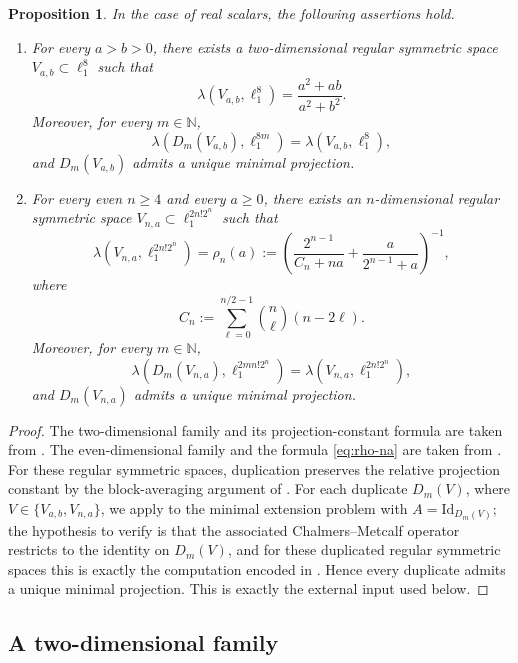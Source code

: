 \documentclass[11pt]{amsart}
\numberwithin{equation}{section}
\newtheorem{proposition}[theorem]{Proposition}
\theoremstyle{definition}
\theoremstyle{remark}
\newcommand{\N}{\mathbb N}
\newcommand{\Id}{\mathrm{Id}}
\begin{document}
\begin{proposition}
\label{prop:regular-input}
In the case of real scalars, the following assertions hold.
\begin{enumerate}[label=\textup{(\roman*)}]
\item For every $a>b>0$, there exists a two-dimensional regular symmetric space $V_{a,b}\subset \ell_1^8$ such that
\[
\lambda(V_{a,b},\ell_1^8)=\frac{a^2+ab}{a^2+b^2}.
\]
Moreover, for every $m\in\N$,
\[
\lambda(D_m(V_{a,b}),\ell_1^{8m})=\lambda(V_{a,b},\ell_1^8),
\]
and $D_m(V_{a,b})$ admits a unique minimal projection.
\item For every even $n\geqslant 4$ and every $a\geqslant 0$, there exists an $n$-dimensional regular symmetric space $V_{n,a}\subset \ell_1^{2n!2^n}$ such that
\begin{equation}
\label{eq:rho-na}
\lambda(V_{n,a},\ell_1^{2n!2^n})
= \rho_n(a)
:=
\left(
\frac{2^{n-1}}{C_n+na}
+
\frac{a}{2^{n-1}+a}
\right)^{-1},
\end{equation}
where
\[
C_n:=\sum_{\ell=0}^{n/2-1} \binom n\ell (n-2\ell).
\]
Moreover, for every $m\in\N$,
\[
\lambda(D_m(V_{n,a}),\ell_1^{2mn!2^n})=\lambda(V_{n,a},\ell_1^{2n!2^n}),
\]
and $D_m(V_{n,a})$ admits a unique minimal projection.
\end{enumerate}
\end{proposition}

\begin{proof}
The two-dimensional family and its projection-constant formula are taken from \cite{CL4}. The even-dimensional family and the formula \eqref{eq:rho-na} are taken from \cite{CL3}. For these regular symmetric spaces, duplication preserves the relative projection constant by the block-averaging argument of \cite[Lemma~2.3]{CL3}. For each duplicate $D_m(V)$, where $V\in\{V_{a,b},V_{n,a}\}$, we apply \cite[Theorem~5]{LP} to the minimal extension problem with $A=\Id_{D_m(V)}$; the hypothesis to verify is that the associated Chalmers--Metcalf operator restricts to the identity on $D_m(V)$, and for these duplicated regular symmetric spaces this is exactly the computation encoded in \cite[Lemma~2.3]{CL3}. Hence every duplicate admits a unique minimal projection. This is exactly the external input used below.
\end{proof}

\subsection*{A two-dimensional family}
\end{document}

